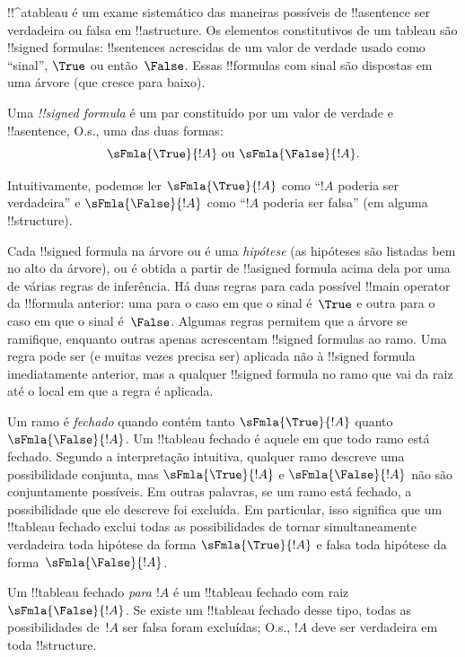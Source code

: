 \documentclass[../../../include/open-logic-section]{subfiles}
\begin{document}
      {}
      {}


!!^a{tableau} é um exame sistemático das maneiras possíveis de
!!a{sentence} ser verdadeira ou falsa em !!a{structure}. Os elementos
constitutivos de um tableau são !!{signed formula}s: !!{sentence}s
acrescidas de um valor de verdade usado como ``sinal'', $\True$ ou
então~$\False$. Essas !!{formula}s com sinal são dispostas em uma árvore
(que cresce para baixo).

\begin{defn}
  Uma \emph{!!{signed formula}} é um par constituído por um valor de
  verdade e !!a{sentence}, O.s.\@, uma das duas formas:
  \[
  \sFmla{\True}{!A} \text{ ou } \sFmla{\False}{!A}.
  \]
\end{defn}

Intuitivamente, podemos ler $\sFmla{\True}{!A}$ como ``$!A$ poderia ser
verdadeira'' e $\sFmla{\False}{!A}$ como ``$!A$ poderia ser falsa'' (em
alguma !!{structure}).

Cada !!{signed formula} na árvore ou é uma \emph{hipótese} (as hipóteses
são listadas bem no alto da árvore), ou é obtida a partir de
!!a{signed formula} acima dela por uma de várias regras de inferência.
Há duas regras para cada possível !!{main operator} da !!{formula}
anterior: uma para o caso em que o sinal é~$\True$ e outra para o caso em
que o sinal é~$\False$. Algumas regras permitem que a árvore se
ramifique, enquanto outras apenas acrescentam !!{signed formula}s ao
ramo. Uma regra pode ser (e muitas vezes precisa ser) aplicada não à
!!{signed formula} imediatamente anterior, mas a qualquer
!!{signed formula} no ramo que vai da raiz até o local em que a regra é
aplicada.

Um ramo é \emph{fechado} quando contém tanto $\sFmla{\True}{!A}$ quanto
$\sFmla{\False}{!A}$. Um !!{tableau} fechado é aquele em que todo ramo
está fechado. Segundo a interpretação intuitiva, qualquer ramo descreve
uma possibilidade conjunta, mas $\sFmla{\True}{!A}$ e
$\sFmla{\False}{!A}$ não são conjuntamente possíveis. Em outras palavras,
se um ramo está fechado, a possibilidade que ele descreve foi excluída.
Em particular, isso significa que um !!{tableau} fechado exclui todas as
possibilidades de tornar simultaneamente verdadeira toda hipótese da
forma $\sFmla{\True}{!A}$ e falsa toda hipótese da
forma~$\sFmla{\False}{!A}$.

Um !!{tableau} fechado \emph{para $!A$} é um !!{tableau} fechado com
raiz~$\sFmla{\False}{!A}$. Se existe um !!{tableau} fechado desse tipo,
todas as possibilidades de~$!A$ ser falsa foram excluídas; O.s.\@, $!A$
deve ser verdadeira em toda !!{structure}.
\end{document}

